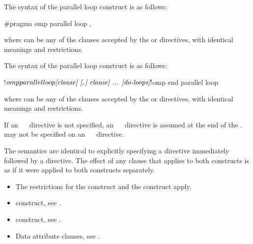 
\syntax
\begin{ccppspecific}
The syntax of the parallel loop construct is as follows:

\begin{ompcPragma}
#pragma omp parallel loop \plc{[clause[ [},\plc{] clause] ... ] new-line}
\end{ompcPragma}

where  can be any of the clauses accepted by the  or
   directives, with identical meanings and restrictions.
\end{ccppspecific}

\begin{fortranspecific}
The syntax of the parallel loop construct is as follows:

\begin{ompfPragma}
!$omp parallel loop \plc{[clause[ [},\plc{] clause] ... ]}
   \plc{do-loops}
\plc{[}!$omp end parallel loop\plc{]}
\end{ompfPragma}

where  can be any of the clauses accepted by the  or
   directives, with identical meanings and restrictions.

If an ~~ directive is not specified, an
  ~~ directive is assumed at the end of the
  .  may not be specified on an
  ~~ directive.
\end{fortranspecific}

\descr
The semantics are identical to explicitly specifying a  directive immediately
followed by a  directive. The effect of any clause that applies to both constructs is as if it were applied to both constructs separately.


\restrictions
\begin{itemize}
\item The restrictions for the  construct and the
   construct apply.
\end{itemize}

\crossreferences
\begin{itemize}
\item {} construct, see
.

\item {} construct, see
.

\item Data attribute clauses, see
.
\end{itemize}




